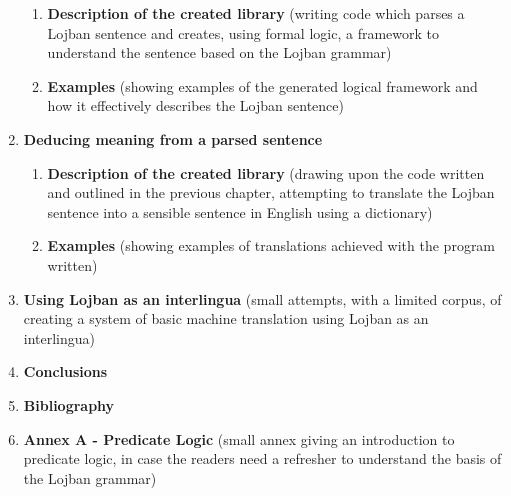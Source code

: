 \begin{enumerate}
        \vspace{-0.4cm}
        \begin{enumerate}[label*=\arabic*.]
            \item \textbf{Description of the created library} (writing code which parses a Lojban sentence and creates, using formal logic, a framework to understand the sentence based on the Lojban grammar)
            \item \textbf{Examples} (showing examples of the generated logical framework and how it effectively describes the Lojban sentence)
        \end{enumerate}
    \item \textbf{Deducing meaning from a parsed sentence}
        \vspace{-0.4cm}
        \begin{enumerate}[label*=\arabic*.]
            \item \textbf{Description of the created library} (drawing upon the code written and outlined in the previous chapter, attempting to translate the Lojban sentence into a sensible sentence in English using a dictionary)
            \item \textbf{Examples} (showing examples of translations achieved with the program written)
        \end{enumerate}
    \item \textbf{Using Lojban as an interlingua} (small attempts, with a limited corpus, of creating a system of basic machine translation using Lojban as an interlingua)
    \item \textbf{Conclusions}
    \item \textbf{Bibliography}
    \item \textbf{Annex A - Predicate Logic} (small annex giving an introduction to predicate logic, in case the readers need a refresher to understand the basis of the Lojban grammar)
\end{enumerate}
